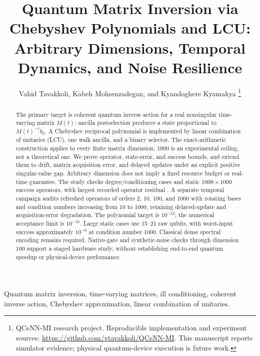 \documentclass[journal]{IEEEtran}
\begin{document}
\title{Quantum Matrix Inversion via Chebyshev Polynomials and LCU: Arbitrary Dimensions, Temporal Dynamics, and Noise Resilience}
\author{Vahid Tavakkoli, Kabeh Mohsenzadegan, and Kyandoghere Kyamakya%
\thanks{QCeNN-MI research project. Reproducible implementation and experiment sources: \url{https://github.com/vtavakkoli/QCeNN-MI}. This manuscript reports simulator evidence; physical quantum-device execution is future work.}}
\maketitle
\begin{abstract}
The primary target is coherent quantum inverse action for a real nonsingular
time-varying matrix $M(t)$: ancilla postselection produces a state proportional
to $M(t)^{-1}b_0$. A Chebyshev reciprocal polynomial is implemented by linear
combination of unitaries (LCU), one walk ancilla, and a binary selector.
The exact-arithmetic construction applies to every finite matrix dimension;
1000 is an experimental ceiling, not a theoretical one. We prove operator,
state-error, and success bounds, and extend them to drift, matrix acquisition
error, and delayed updates under an explicit positive singular-value gap.
Arbitrary dimension does not imply a fixed resource budget or real-time
guarantee. The study checks \TheoryCaseCount{} degree/conditioning cases and
\PrecisionCaseCount{} static $1000\times1000$ success operators, with largest
recorded operator residual \WorstOperatorResidual{}. A separate temporal
campaign audits \TimeVaryingSnapshotCount{} refreshed operators of orders
2, 10, 100, and 1000 with rotating bases and condition numbers increasing
from 10 to 1000, retaining delayed-update and acquisition-error degradation.
The polynomial target is $10^{-12}$; the numerical acceptance limit is
$10^{-10}$. Large static cases use 15--21 raw qubits, with worst-input
success approximately $10^{-6}$ at condition number 1000. Classical dense
spectral encoding remains required. Native-gate and synthetic-noise checks
through dimension 100 support a staged hardware study, without establishing
end-to-end quantum speedup or physical-device performance.
\end{abstract}
\begin{IEEEkeywords}
Quantum matrix inversion, time-varying matrices, ill conditioning,
coherent inverse action, Chebyshev approximation, linear combination of unitaries.
\end{IEEEkeywords}
\end{document}
